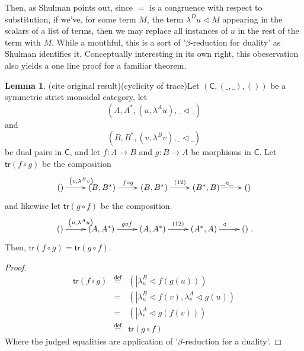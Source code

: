 \documentclass[pra,floatfix,
amsmath,superscriptaddress, 12pt]{article}
\theoremstyle{definition}
\newtheorem{lem}[thm]{Lemma}
\begin{document}
\par

Then, as Shulman points out, since $=$ is a congruence with respect
to substitution, if we've, for some term $M$, the term $\lambda^{D}u\triangleleft M$
appearing in the scalars of a list of terms, then we may replace all
instances of $u$ in the rest of the term with $M$. While a mouthful,
this is a sort of '$\beta$-reduction for duality' as Shulman identifies it. Conceptually interesting in its own right, this obeservation also yields a one line
proof for a familiar theorem.
\begin{lem}
(cite original result)(cyclicity of trace)Let $\left(\mathsf{C},\left(\_,\_\right),\left(\right)\right)$
be a symmetric strict monoidal category, let 
\[
\left(A,A^{*},\left(u,\lambda^{A}u\right),\_\triangleleft\_\right)
\]
 and 
\[
\left(B,B^{*},\left(v,\lambda^{B}v\right),\_\triangleleft\_\right)
\]
 be dual pairs in $\mathsf{C}$, and let $f:A\longrightarrow B$ and $g:B\longrightarrow A$
be morphisms in $\mathsf{C}$. Let $\mathsf{tr}\left(f\circ g\right)$ be
the composition 
\[
\xymatrixrowsep{0pc}\xymatrix{\left(\right)\ar[r]^{\left(v,\lambda^{B}v\right)} & \left(B,B^{*}\right)\ar[r]^{f\circ g} & \left(B,B^{*}\right)\ar[r]^{\left(12\right)} & \left(B^{*},B\right)\ar[r]^{\_\triangleleft\_} & \left(\right)}
\]
and likewise let $\mathsf{tr}\left(g\circ f\right)$ be the composition.
\[
\xymatrixrowsep{0pc}\xymatrix{\left(\right)\ar[r]^{\left(u,\lambda^{A}u\right)} & \left(A,A^{*}\right)\ar[r]^{g\circ f} & \left(A,A^{*}\right)\ar[r]^{\left(12\right)} & \left(A^{*},A\right)\ar[r]^{\_\triangleleft\_} & \left(\right)}
.
\]
Then, $\mathsf{tr}\left(f\circ g\right)=\mathsf{tr}\left(g\circ f\right)$.
\end{lem}

\begin{proof}
\begin{eqnarray*}
\mathsf{tr}\left(f\circ g\right) & \overset{\mathsf{def}}{=} & \left(\left|\lambda_{u}^{B}\triangleleft f\left(g\left(u\right)\right)\right.\right)\\
 & = & \left(\left|\lambda_{u}^{B}\triangleleft f\left(v\right)\right.,\lambda_{v}^{A}\triangleleft g\left(u\right)\right)\\
 & = & \left(\left|\lambda_{v}^{A}\triangleleft g\left(f\left(v\right)\right)\right.\right)\\
 & \overset{\mathsf{def}}{=} & \mathsf{tr}\left(g\circ f\right)
\end{eqnarray*}
Where the judged equalities are application of '$\beta$-reduction
for a duality'.
\end{proof}
\end{document}
